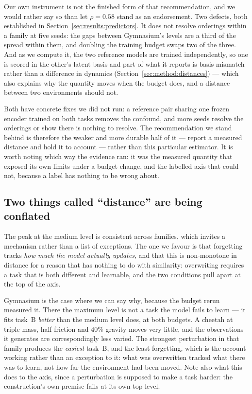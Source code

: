 Our own instrument is not the finished form of that recommendation, and we
would rather say so than let $\rho = 0.58$ stand as an endorsement. Two defects,
both established in Section~\ref{sec:results:predictors}. It does not resolve
orderings within a family at five seeds: the gaps between Gymnasium's levels are
a third of the spread within them, and doubling the training budget swaps two of
the three. And as we compute it, the two reference models are trained
independently, so one is scored in the other's latent basis and part of what it
reports is basis mismatch rather than a difference in dynamics
(Section~\ref{sec:method:distances}) --- which also explains why the quantity
moves when the budget does, and a distance between two environments should not.

Both have concrete fixes we did not run: a reference pair sharing one frozen
encoder trained on both tasks removes the confound, and more seeds resolve the
orderings or show there is nothing to resolve. The recommendation we stand
behind is therefore the weaker and more durable half of it --- report a measured
distance and hold it to account --- rather than this particular estimator. It is
worth noting which way the evidence ran: it was the measured quantity that
exposed its own limits under a budget change, and the labelled axis that could
not, because a label has nothing to be wrong about.

\subsection{Two things called ``distance'' are being conflated}
\label{sec:discussion:conflation}

The peak at the medium level is consistent across families, which invites a
mechanism rather than a list of exceptions. The one we favour is that forgetting
tracks \emph{how much the model actually updates}, and that this is non-monotone
in distance for a reason that has nothing to do with similarity: overwriting
requires a task that is both different and learnable, and the two conditions
pull apart at the top of the axis.

Gymnasium is the case where we can say why, because the budget rerun measured
it. There the maximum level is not a task the model fails to learn --- it fits
task~B \emph{better} than the medium level does, at both budgets. A cheetah at
triple mass, half friction and $40\%$ gravity moves very little, and the
observations it generates are correspondingly less varied. The strongest
perturbation in that family produces the \emph{easiest} task~B, and the least
forgetting, which is the account working rather than an exception to it: what
was overwritten tracked what there was to learn, not how far the environment had
been moved. Note also what this does to the axis, since a perturbation is
supposed to make a task harder: the construction's own premise fails at its own
top level.

